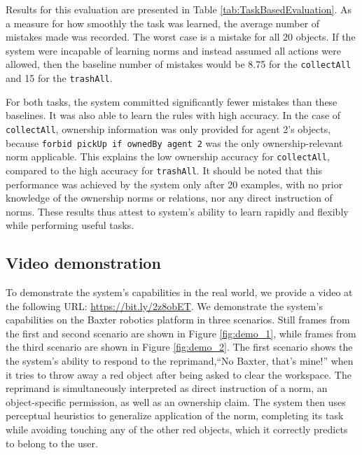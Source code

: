 \documentclass[letterpaper]{article} %
\begin{document}
Results for this evaluation are presented in Table \ref{tab:TaskBasedEvaluation}. As a measure for how smoothly the task was learned, the average number of mistakes made was recorded. The worst case is a mistake for all $20$ objects. If the system were incapable of learning norms and instead assumed all actions were allowed, then the baseline number of mistakes would be 8.75 for the \texttt{\small collectAll} and 15 for the \texttt{\small trashAll}.

For both tasks, the system committed significantly fewer mistakes than these baselines. It was also able to learn the rules with high accuracy. In the case of \texttt{\small collectAll}, ownership information was only provided for agent 2's objects, because \texttt{\small forbid pickUp if ownedBy agent 2} was the only ownership-relevant norm applicable. This explains the low ownership accuracy for \texttt{\small collectAll}, compared to the high accuracy for \texttt{\small trashAll}. It should be noted that this performance was achieved by the system only after 20 examples, with no prior knowledge of the ownership norms or relations, nor any direct instruction of norms. These results thus attest to system's ability to learn rapidly and flexibly while performing useful tasks.

\vspace{-0.84mm}
\vspace{-1.48mm}
\subsection{Video demonstration}

To demonstrate the system's capabilities in the real world, we provide a video at the following URL: \url{https://bit.ly/2z8obET}. We demonstrate the system's capabilities on the Baxter robotics platform in three scenarios. Still frames from the first and second scenario are shown in Figure \ref{fig:demo_1}, while frames from the third scenario are shown in Figure \ref{fig:demo_2}.  The first scenario shows the the system's ability to respond to the reprimand,``No Baxter, that's mine!'' when it tries to throw away a red object after being asked to clear the workspace. The reprimand is simultaneously interpreted as direct instruction of a norm, an object-specific permission, as well as an ownership claim. The system then uses perceptual heuristics to generalize application of the norm, completing its task while avoiding touching any of the other red objects, which it correctly predicts to belong to the user.
\end{document}

